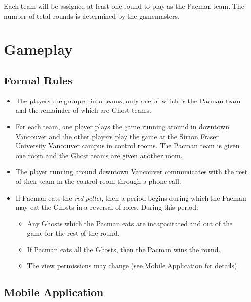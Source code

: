 \documentclass[10pt, oneside, letterpaper, titlepage]{article}
\begin{document}
	Each team will be assigned at least one round to play as the Pacman team. The number of total rounds is determined by the gamemasters.

	\section{Gameplay}
	\label{sec:gameplay}

	\subsection{Formal Rules}
	\label{subsec:gameplay:formal-rules}

	\begin{itemize}
		\item The players are grouped into teams, only one of which is the Pacman team and the remainder of which are Ghost teams.
		\item For each team, one player plays the game running around in downtown Vancouver and the other players play the game at the Simon Fraser University Vancouver campus in control rooms. The Pacman team is given one room and the Ghost teams are given another room.
		\item The player running around downtown Vancouver communicates with the rest of their team in the control room through a phone call.
		\item If Pacman eats the \emph{red pellet}, then a period begins during which the Pacman may eat the Ghosts in a reversal of roles. During this period:
		\begin{itemize}
			\item Any Ghosts which the Pacman eats are incapacitated and out of the game for the rest of the round.
			\item If Pacman eats all the Ghosts, then the Pacman wins the round.
			\item The view permissions may change (see \hyperref[subsec:gameplay:mobile-application]{Mobile Application} for details).
		\end{itemize}
	\end{itemize}

	\subsection{Mobile Application}
	\label{subsec:gameplay:mobile-application}
\end{document}
